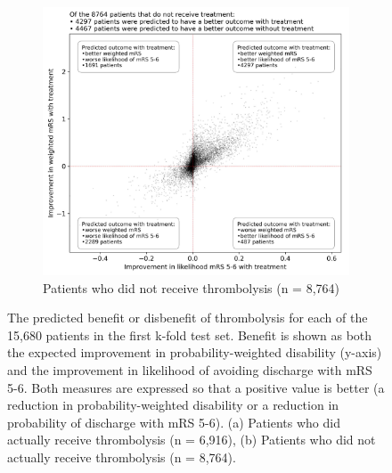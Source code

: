 \begin{figure}
    \begin{subfigure}{.7\textwidth}
      \centering
      \captionsetup{width=.9\linewidth}
      \includegraphics[trim={0 0 0 1.7cm}, clip, width=1\linewidth]{./images/p4_scatter_not_treated}
      \caption{\footnotesize{Patients who did not receive thrombolysis (n = 8,764)}}
      \label{fig:scatter_not_receive}
    \end{subfigure}
  \caption{The predicted benefit or disbenefit of thrombolysis for each of the 15,680 patients in the first k-fold test set. Benefit is shown as both the expected improvement in probability-weighted disability (y-axis) and the improvement in likelihood of avoiding discharge with mRS 5-6. Both measures are expressed so that a positive value is better (a reduction in probability-weighted disability or a reduction in probability of discharge with mRS 5-6). (a) Patients who did actually receive thrombolysis (n = 6,916), (b) Patients who did not actually receive thrombolysis (n = 8,764).}
\label{fig:scatter_all}
\end{figure}

